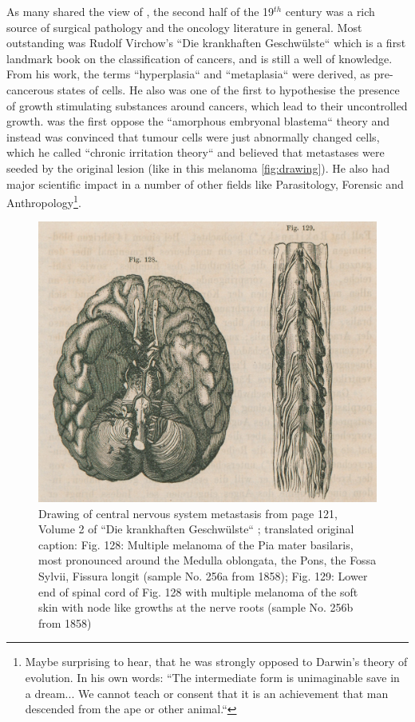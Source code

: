 As many shared the view of \citeauthor{Bennett1849}, the second half of the 19$^{th}$ century was a rich source of surgical pathology and the oncology literature in general. Most outstanding was Rudolf Virchow's ``Die krankhaften Geschw\"ulste`` \cite{Virchow1863} which is a first landmark book on the classification of cancers, and is still a well of knowledge. From his work, the terms ``hyperplasia`` and ``metaplasia``  were derived, as pre-cancerous states of cells. He also was one of the first to hypothesise the presence of growth stimulating substances around cancers, which lead to their uncontrolled growth. \citeauthor{Virchow1863} was the first oppose the ``amorphous embryonal blastema`` theory and instead was convinced that tumour cells were just abnormally changed cells, which he called ``chronic irritation theory`` and believed that metastases were seeded by the original lesion (like in this melanoma \autoref{fig:drawing}). He also had major scientific impact in a number of other fields like Parasitology, Forensic and Anthropology\footnote{Maybe surprising to hear, that he was strongly opposed to Darwin's theory of evolution. In his own words: ``The intermediate form is unimaginable save in a dream... We cannot teach or consent that it is an achievement that man descended from the ape or other animal.``}.

\begin{figure}[!ht]
\centering
\includegraphics[width=.95\linewidth]{Figures/intro/drawingMelaMeta}
\caption[Drawing of central nervous system metastasis]{Drawing of central nervous system metastasis from page 121, Volume 2 of ``Die krankhaften Geschw\"ulste`` \protect\textcite{Virchow1863}; translated original caption: Fig. 128: Multiple melanoma of the Pia mater basilaris, most pronounced around the Medulla oblongata, the Pons, the Fossa Sylvii, Fissura longit (sample No. 256a from 1858); Fig. 129: Lower end of spinal cord of Fig. 128 with multiple melanoma of the soft skin with node like growths at the nerve roots (sample No. 256b from 1858)}\label{fig:drawing}
\end{figure}

